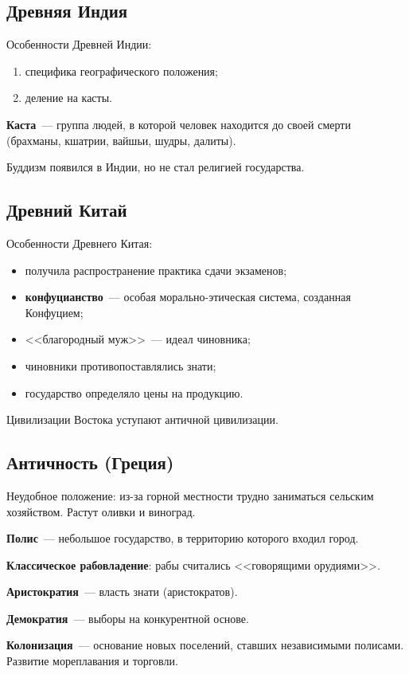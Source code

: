 \documentclass[a4paper, 12pt]{article}
\begin{document}
\subsection{Древняя Индия}
Особенности Древней Индии:
\begin{enumerate}[noitemsep]
  \item специфика географического положения;
  \item деление на касты.
\end{enumerate}

\textbf{Каста}~--- группа людей, в которой человек находится до своей смерти
(брахманы, кшатрии, вайшьи, шудры, далиты).

Буддизм появился в Индии, но не стал религией государства.

\subsection{Древний Китай}
Особенности Древнего Китая:
\begin{itemize}[noitemsep]
  \item получила распространение практика сдачи экзаменов;
  \item \textbf{конфуцианство}~--- особая морально-этическая система,
  созданная Конфуцием;
  \item <<благородный муж>>~--- идеал чиновника;
  \item чиновники противопоставлялись знати;
  \item государство определяло цены на продукцию.
\end{itemize}

Цивилизации Востока уступают античной цивилизации.

\subsection{Античность (Греция)}
Неудобное положение: из-за горной местности трудно заниматься сельским
хозяйством. Растут оливки и виноград.

\textbf{Полис}~--- небольшое государство, в территорию которого входил город.

\textbf{Классическое рабовладение}: рабы считались <<говорящими орудиями>>.

\textbf{Аристократия}~--- власть знати (аристократов).

\textbf{Демократия}~--- выборы на конкурентной основе.

\textbf{Колонизация}~--- основание новых поселений, ставших независимыми
полисами. Развитие мореплавания и торговли.
\end{document}
